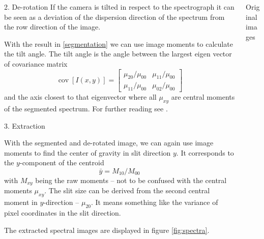 \documentclass[final,t]{beamer}
\begin{document}
\begin{frame}
\begin{columns}[t]
\begin{column}{.32\linewidth}
\begin{block}{2. De-rotation}
					If the camera is tilted in respect to the spectrograph it can be seen as a deviation of the dispersion direction of the spectrum from the row direction of the image.
					
					With the result in \ref{segmentation} we can use image moments to calculate the tilt angle.
					The tilt angle is the angle between the largest eigen vector of covariance matrix
					$$\operatorname{cov}[I(x,y)] = \begin{bmatrix} \mu_{20} / \mu_{00} & \mu_{11} / \mu_{00} \\ \mu_{11} / \mu_{00} & \mu_{02} / \mu_{00} \end{bmatrix}$$
					and the axis closest to that eigenvector where all $\mu_{xy}$ are central moments of the segmented spectrum.
					For further reading see \cite{ImageMoments}.
				\end{block}
			
				\begin{block}{3. Extraction}
					\label{extraction}
			
					With the segmented and de-rotated image, we can again use image moments to find the center of gravity in slit direction $y$. It corresponds to the $y$-component of the centroid
					$$\bar{y} = M_{10} / M_{00}$$
					with $M_{xy}$ being the raw moments -- not to be confused with the central moments $\mu_{xy}$.
					The slit size can be derived from the second central moment in $y$-direction -- $\mu_{20}$.
					It means something like the variance of pixel coordinates in the slit direction.
					
					The extracted spectral images are displayed in figure \ref{fig:spectra}.
				\end{block}     
				
				
			\end{column}
			
			
			
			\begin{column}{.32\linewidth}
				
				\begin{block}{Original images}


\end{block}
\end{column}
\end{columns}
\end{frame}
\end{document}
